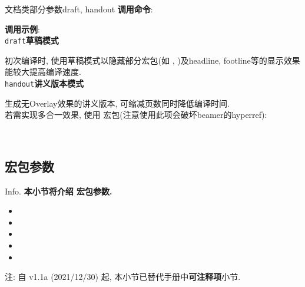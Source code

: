 \begin{frame}{文档类部分参数}{draft, handout}
	\textbf{调用命令}: 

  \textbf{调用示例}: \\

  \alert{\texttt{draft}}\hfill \textbf{草稿模式}

	初次编译时, 使用草稿模式以隐藏部分宏包(如 , )及headline, footline等的显示效果能较大提高编译速度.\\

	\alert{\texttt{handout}}\hfill \textbf{讲义版本模式}

	生成无Overlay效果的讲义版本, 可缩减页数同时降低编译时间.\\
	若需实现多合一效果, 使用  宏包(注意使用此项会破坏beamer的hyperref):
	\begin{center}
		\begin{minipage}{.8\textwidth}
			\raggedright
			\\
		\end{minipage}
	\end{center}
\end{frame}

\subsection{ 宏包参数}
\begin{frame}{Info.}
	\textbf{本小节将介绍  宏包参数.}
	\begin{multicols}{2}
		\begin{itemize}
			\item {}
			\item {}
			\item {}
			\item {}
			\item {}
		\end{itemize}
	\end{multicols}
	注: 自 \textcolor{univgreen}{v1.1a (2021/12/30)} 起, 本小节已替代手册中\alert{\textbf{可注释项}}小节.\par
	\mycopyright
\end{frame}

